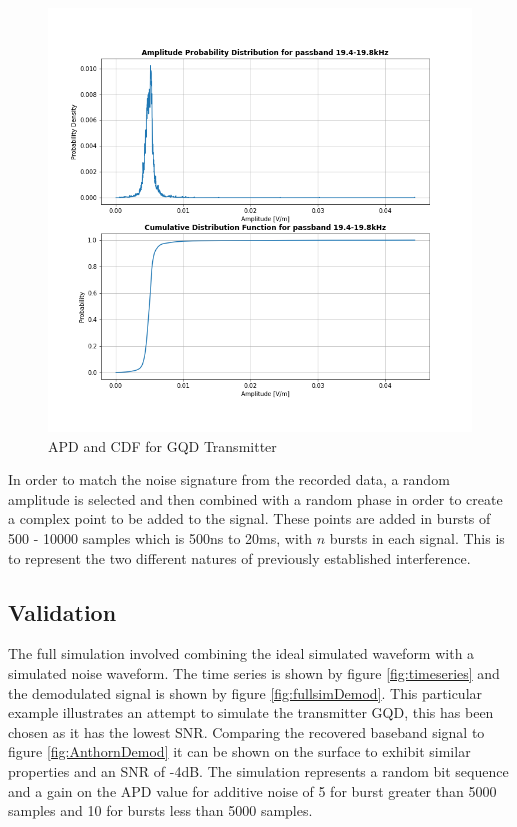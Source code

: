 \begin{figure}[h!]
    \centering
    \includegraphics[width = \textwidth]{figs/sim/apdcdf.png}
    \caption{APD and CDF for GQD Transmitter}
    \label{fig:apdcdf}
\end{figure}

In order to match the noise signature from the recorded data, a random amplitude is selected and then combined with a random phase in order to create a complex point to be added to the signal. These points are added in bursts of 500 - 10000 samples which is 500\si{\nano\second} to 20\si{\milli\second}, with $n$ bursts in each signal. This is to represent the two different natures of previously established interference.

\pagebreak
\subsection{Validation}
The full simulation involved combining the ideal simulated waveform with a simulated noise waveform. The time series is shown by figure \ref{fig:timeseries} and the demodulated signal is shown by figure \ref{fig:fullsimDemod}. This particular example illustrates an attempt to simulate the transmitter GQD, this has been chosen as it has the lowest SNR. Comparing the recovered baseband signal to figure \ref{fig:AnthornDemod} it can be shown on the surface to exhibit similar properties and an SNR of -4dB. The simulation represents a random bit sequence and a gain on the APD value for additive noise of 5 for burst greater than 5000 samples and 10 for bursts less than 5000 samples.

